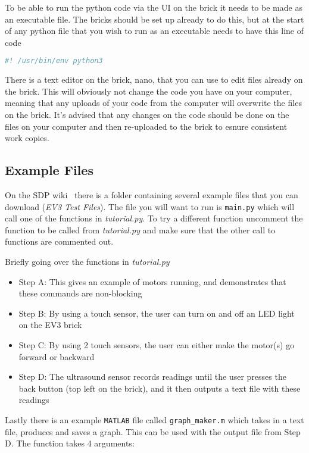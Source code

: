 \documentclass{article}
\begin{document}
To be able to run the python code via the UI on the brick it needs to be made as an executable file. The bricks should be set up already to do this, but at the start of any python file that you wish to run as an executable needs to have this line of code

\begin{lstlisting}[language=Python]
#! /usr/bin/env python3
\end{lstlisting}

There is a text editor on the brick, nano, that you can use to edit files already on the brick. This will obviously not change the code you have on your computer, meaning that any uploads of your code from the computer will overwrite the files on the brick. It's advised that any changes on the code should be done on the files on your computer and then re-uploaded to the brick to esnure consistent work copies. 

\subsection{Example Files}
On the SDP wiki~\cite{sdpWiki} there is a folder containing several example files that you can download (\textit{EV3 Test Files}). The file you will want to run is \texttt{main.py} which will call one of the functions in \textit{tutorial.py}. To try a different function uncomment the function to be called from \textit{tutorial.py} and make sure that the other call to functions are commented out. 

Briefly going over the functions in \textit{tutorial.py}
\begin{itemize}
    \item Step A: This gives an example of motors running, and demonstrates that these commands are non-blocking
    \item Step B: By using a touch sensor, the user can turn on and off an LED light on the EV3 brick
    \item Step C: By using 2 touch sensors, the user can either make the motor(s) go forward or backward
    \item Step D: The ultrasound sensor records readings until the user presses the back button (top left on the brick), and it then outputs a text file with these readings
\end{itemize}

Lastly there is an example \texttt{MATLAB} file called \texttt{graph\_maker.m} which takes in a text file, produces and saves a graph. This can be used with the output file from Step D. The function takes 4 arguments:
\end{document}
